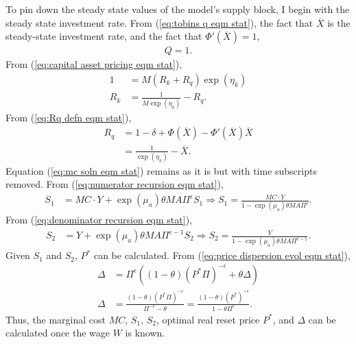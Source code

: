 \documentclass[12 pt, oneside]{article}
\theoremstyle{definition}
\theoremstyle{definition}
\theoremstyle{definition}
\begin{document}
To pin down the steady state values of the model's supply block, I begin with the steady state investment rate. From (\ref{eq:tobins q eqm stat}), the fact that $\overline{X}$ is the steady-state investment rate, and the fact that $\Phi'(\overline{X}) = 1$,
\begin{align*}
  Q = 1.
\end{align*}
From (\ref{eq:capital asset pricing eqm stat}),
\begin{align*}
  1 & = M(R_k + R_q)\exp(\eta_k)\\
  R_k & = \frac{1}{M \exp(\eta_k)} - R_q.
\end{align*}
From (\ref{eq:Rq defn eqm stat}),
\begin{align*}
  R_q & = 1 - \delta + \Phi(\overline{X}) - \Phi'(\overline{X})\overline{X}\\
      & = \frac{1}{\exp(\eta_k)} - \overline{X}.
\end{align*}
Equation (\ref{eq:mc soln eqm stat}) remains as it is but with time subscripts removed. From (\ref{eq:numerator recursion eqm stat}),
\begin{align*}
  S_1 & = MC \cdot Y + \exp(\mu_a)\theta M A \Pi^\epsilon S_1 \Rightarrow S_1 = \frac{MC\cdot Y}{1 - \exp(\mu_a)\theta M A \Pi^\epsilon}.
\end{align*}
From (\ref{eq:denominator recursion eqm stat}),
\begin{align*}
  S_2 & = Y + \exp(\mu_a)\theta M A \Pi^{\epsilon - 1}S_2 \Rightarrow S_2 = \frac{Y}{1 - \exp(\mu_a)\theta M A \Pi^{\epsilon - 1}}.
\end{align*}
Given $S_1$ and $S_2$, $P^*$ can be calculated.
From (\ref{eq:price dispersion evol eqm stat}),
\begin{align*}
  \Delta & = \Pi^\epsilon\left((1 - \theta)(P^* \Pi)^{-\epsilon} + \theta \Delta\right)\\
  \Delta & = \frac{(1 - \theta)(P^* \Pi)^{-\epsilon}}{\Pi^{-\epsilon} - \theta} = \frac{(1- \theta)(P^*)^{-\epsilon}}{1 - \theta \Pi^{\epsilon}}.
\end{align*}
Thus, the marginal cost $MC$, $S_1$, $S_2$, optimal real reset price $P^*$, and $\Delta$ can be calculated once the wage $W$ is known.
\end{document}
